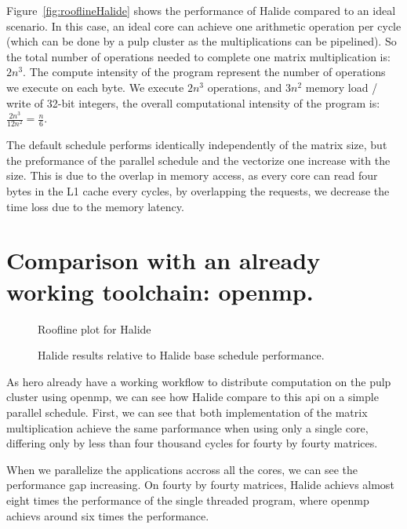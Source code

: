 	Figure~\ref{fig:rooflineHalide} shows the performance of Halide compared to an ideal scenario. In this case, an ideal core can achieve one arithmetic operation per cycle (which can be done by a \gls{pulp} cluster as the multiplications can be pipelined).
So the total number of operations needed to complete one matrix multiplication is: $2n^3$.
	The compute intensity of the program represent the number of operations we execute on each byte. We execute $2n^3$ operations, and  $3n^2$ memory load / write of 32-bit integers, the overall computational intensity of the program is: $\frac{2n^3}{12n^2}=\frac{n}{6}$.

	The default schedule performs identically independently of the matrix size, but the preformance of the parallel schedule and the vectorize one increase with the size.
	This is due to the  overlap in memory access, as every core can read four bytes in the  L1 cache every cycles, by overlapping the requests, we decrease the time loss due to the memory latency.


	
\section{Comparison with an already working toolchain: \acrshort{openmp}.}

\begin{figure}[H]
		\center
	\scalebox{.6}{}
    \caption{Roofline plot for Halide}
	\label{fig:rooflineHalideOpenMP}
\end{figure}
\begin{figure}[H]
		\center
		\scalebox{.6}{}
    \caption{Halide results relative to Halide base schedule performance.}
	\label{fig:barPlotHalideOpenMP}
\end{figure}



As \gls{hero} already have a working workflow to distribute computation on the \gls{pulp} cluster using \gls{openmp}, we can see how Halide compare to this \gls{api} on a simple  parallel schedule.
	First, we can see that both implementation of the matrix multiplication achieve the same parformance when using only a single core, differing only by less than four thousand cycles for fourty by fourty matrices.

	When we parallelize the applications accross all the cores, we can see the  performance gap increasing. On fourty by fourty matrices, Halide achievs almost eight times the performance of the single threaded program, where \gls{openmp} achievs around six times the performance.


